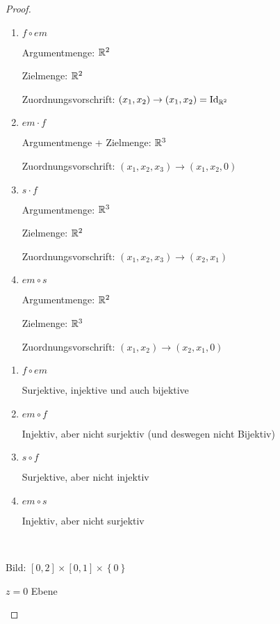 \begin{proof}
	\begin{parts}
		\item
		\begin{enumerate}[label=(\roman*)]
			\item $f\circ em$
			
			
			Argumentmenge: $\mathbb{R}^2$
			
			Zielmenge: $\mathbb{R}^2$
			
			Zuordnungsvorschrift:  $(x_1,x_2)\to (x_1,x_2)=\text{Id}_{\mathbb{R}^2}$
			
			\item $em \cdot f$
			
			Argumentmenge + Zielmenge:  $\mathbb{R}^3$ 
			
			Zuordnungsvorschrift: $(x_1,x_2,x_3)\to (x_1,x_2,0)$ 
			
			\item $s\cdot f$ 
			
			Argumentmenge: $\mathbb{R}^3$ 
			
			Zielmenge: $\mathbb{R}^2$ 
			
			Zuordnungsvorschrift: $(x_1,x_2,x_3)\to (x_2,x_1)$
			\item $em\circ s$
			
			Argumentmenge:  $\mathbb{R}^2$
			
			Zielmenge:  $\mathbb{R}^3$
			
			Zuordnungsvorschrift:  $(x_1,x_2)\to (x_2,x_1,0)$
		\end{enumerate}
		\item
		\begin{enumerate}[label=(\roman*)]
			\item $f\circ em$
			
			Surjektive, injektive und auch bijektive
			
			\item $em\circ f$ 
			
			Injektiv, aber nicht surjektiv (und deswegen nicht Bijektiv)
			
			\item $s\circ f$ 
			
			Surjektive, aber nicht injektiv
			
			\item $em\circ s$ 
			
			Injektiv, aber nicht surjektiv
		\end{enumerate}
	\item \noindent \\


		\begin{minipage}{0.4\textwidth}
			Bild: $[0,2]\times [0,1]\times \left\{ 0 \right\} $ 
			\begin{center}
				$z=0$ Ebene



\end{center}
\end{minipage}
\end{parts}
\end{proof}
